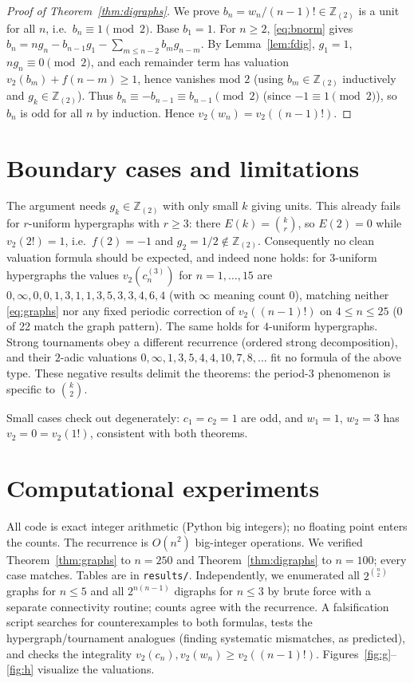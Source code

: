 \documentclass[11pt]{article}
\theoremstyle{definition}
\begin{document}
\begin{proof}[Proof of Theorem~\ref{thm:digraphs}]
We prove $b_n = w_n/(n-1)! \in \mathbb{Z}_{(2)}$ is a unit for all $n$,
i.e.\ $b_n \equiv 1 \pmod 2$. Base $b_1 = 1$.
For $n \ge 2$, \eqref{eq:bnorm} gives
$b_n = ng_n - b_{n-1}g_1 - \sum_{m\le n-2} b_m g_{n-m}$.
By Lemma~\ref{lem:fdig}, $g_1=1$, $ng_n \equiv 0 \pmod 2$, and each
remainder term has valuation $v_2(b_m)+f(n-m) \ge 1$, hence vanishes
mod $2$ (using $b_m \in \mathbb{Z}_{(2)}$ inductively and $g_k \in
\mathbb{Z}_{(2)}$). Thus $b_n \equiv -b_{n-1} \equiv b_{n-1} \pmod 2$
(since $-1 \equiv 1 \pmod 2$), so $b_n$ is odd for all $n$ by induction.
Hence $v_2(w_n) = v_2((n-1)!)$.
\end{proof}

\section{Boundary cases and limitations}\label{sec:boundary}
The argument needs $g_k \in \mathbb{Z}_{(2)}$ with only small $k$ giving
units. This already fails for $r$-uniform hypergraphs with $r \ge 3$:
there $E(k)=\binom{k}{r}$, so $E(2)=0$ while $v_2(2!)=1$, i.e.\
$f(2)=-1$ and $g_2 = 1/2 \notin \mathbb{Z}_{(2)}$.
Consequently no clean valuation formula should be expected, and indeed
none holds: for $3$-uniform hypergraphs the values
$v_2(c^{(3)}_n)$ for $n=1,\dots,15$ are
$0,\infty,0,0,1,3,1,1,3,5,3,3,4,6,4$ (with $\infty$ meaning count $0$),
matching neither \eqref{eq:graphs} nor any fixed periodic correction
of $v_2((n-1)!)$ on $4 \le n \le 25$ (0 of 22 match the graph pattern).
The same holds for $4$-uniform hypergraphs. Strong tournaments obey a
different recurrence (ordered strong decomposition), and their
$2$-adic valuations $0,\infty,1,3,5,4,4,10,7,8,\dots$ fit no formula of
the above type. These negative results delimit the theorems: the
period-$3$ phenomenon is specific to $\binom{k}{2}$.

Small cases check out degenerately: $c_1=c_2=1$ are odd, and
$w_1=1$, $w_2=3$ has $v_2=0=v_2(1!)$, consistent with both theorems.

\section{Computational experiments}
All code is exact integer arithmetic (Python big integers); no floating
point enters the counts. The recurrence is $O(n^2)$ big-integer
operations. We verified Theorem~\ref{thm:graphs} to $n=250$ and
Theorem~\ref{thm:digraphs} to $n=100$; every case matches. Tables are in
\texttt{results/}. Independently, we enumerated all $2^{\binom{n}{2}}$
graphs for $n \le 5$ and all $2^{n(n-1)}$ digraphs for $n \le 3$ by brute
force with a separate connectivity routine; counts agree with the
recurrence. A falsification script searches for counterexamples to both
formulas, tests the hypergraph/tournament analogues (finding systematic
mismatches, as predicted), and checks the integrality
$v_2(c_n),v_2(w_n) \ge v_2((n-1)!)$. Figures~\ref{fig:g}--\ref{fig:h}
visualize the valuations.
\end{document}
